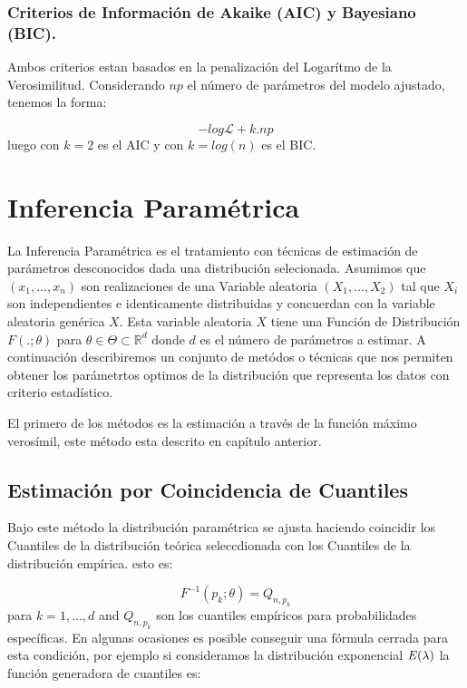 \documentclass[10pt,]{article}
\begin{document}
\hypertarget{criterios-de-informacion-de-akaike-aic-y-bayesiano-bic.}{%
\subsubsection{Criterios de Información de Akaike (AIC) y Bayesiano
(BIC).}\label{criterios-de-informacion-de-akaike-aic-y-bayesiano-bic.}}

Ambos criterios estan basados en la penalización del Logarítmo de la
Verosimilitud. Considerando \(np\) el número de parámetros del modelo
ajustado, tenemos la forma:

\[-log\mathcal{L} + k.np\] luego con \(k=2\) es el AIC y con
\(k=log(n)\) es el BIC.

\hypertarget{inferencia-parametrica}{%
\section{Inferencia Paramétrica}\label{inferencia-parametrica}}

La Inferencia Paramétrica es el tratamiento con técnicas de estimación
de parámetros desconocidos dada una distribución selecionada. Asumimos
que \((x_1, ..., x_n)\) son realizaciones de una Variable aleatoria
\((X_1, ...,X_2)\) tal que \(X_i\) son independientes e identicamente
distribuidas y concuerdan con la variable aleatoria genérica \(X\). Esta
variable aleatoria \(X\) tiene una Función de Distribución
\(F(.;\theta)\) para \(\theta \in \Theta \subset \mathbb{R}^d\) donde
\(d\) es el número de parámetros a estimar. A continuación describiremos
un conjunto de metódos o técnicas que nos permiten obtener los
parámetrtos optimos de la distribución que representa los datos con
criterio estadístico.

El primero de los métodos es la estimación a través de la función máximo
verosímil, este método esta descrito en capítulo anterior.

\hypertarget{estimacion-por-coincidencia-de-cuantiles}{%
\subsection{Estimación por Coincidencia de
Cuantiles}\label{estimacion-por-coincidencia-de-cuantiles}}

Bajo este método la distribución paramétrica se ajusta haciendo
coincidir los Cuantiles de la distribución teórica seleccdionada con los
Cuantiles de la distribución empírica. esto es:

\[F^{-1}(p_k;\theta)=Q_{n,p_k}\] para \(k=1, ...,d\) and \(Q_{n,p_{k}}\)
son los cuantiles empíricos para probabilidades específicas. En algunas
ocasiones es posible conseguir una fórmula cerrada para esta condición,
por ejemplo si consideramos la distribución exponencial
\(\it{E}(\lambda)\) la función generadora de cuantiles es:
\end{document}
